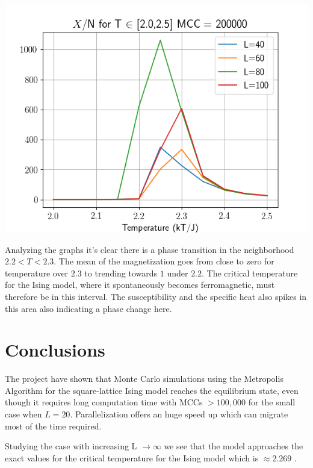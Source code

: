 \documentclass[a4paper, fontsize=11pt]{article}
\begin{document}
\begin{center}
\includegraphics[scale=0.7]{p4.png} 
\end{center}

Analyzing the graphs it's clear there is a phase transition in the neighborhood $2.2 < T < 2.3$. The mean of the magnetization goes from close to zero for temperature over $2.3$ to trending towards $1$ under $2.2$. The critical temperature for the Ising model, where it spontaneously becomes ferromagnetic, must therefore be in this interval. The susceptibility and the specific heat also spikes in this area also indicating a phase change here.


\section{Conclusions}
The project have shown that Monte Carlo simulations using the Metropolis Algorithm for the square-lattice Ising model reaches the equilibrium state, even though it requires long computation time with MCCs $ > 100,000$ for the small case when $L = 20$. Parallelization offers an huge speed up which can migrate most of the time required.


Studying the case with increasing L $\rightarrow \infty$ we see that the model approaches the exact values for the critical temperature for the Ising model which is $\approx 2.269$ \cite{Hjort-Jensen}.




\end{document}

